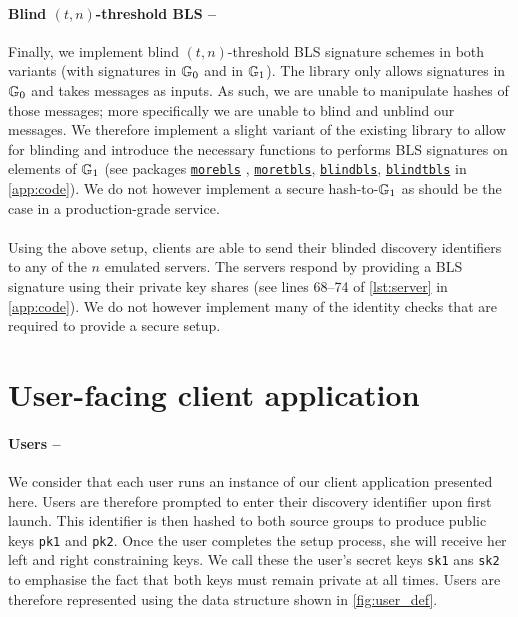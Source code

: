   	\paragraph{Blind $(t,n)$-threshold BLS --} Finally, we implement blind $(t,n)$-threshold BLS signature schemes in both variants (with signatures in $\mathbb{G}_0$ and in $\mathbb{G}_1$). The \kyber\;library only allows signatures in $\mathbb{G}_0$ and takes messages as inputs. As such, we are unable to manipulate hashes of those messages; more specifically we are unable to blind and unblind our messages. We therefore implement a slight variant of the existing library to allow for blinding and introduce the necessary functions to performs BLS signatures on elements of $\mathbb{G}_1$  (see packages \hyperref[app:morebls]{\texttt{morebls}} , \hyperref[app:moretbls]{\texttt{moretbls}}, \hyperref[app:blindbls]{\texttt{blindbls}}, \hyperref[app:blindtbls]{\texttt{blindtbls}} in \autoref{app:code}). We do not however implement a secure hash-to-$\mathbb{G}_1$ as should be the case in a production-grade service.
  	
  	\paragraph{} Using the above setup, clients are able to send their blinded discovery identifiers to any of the $n$ emulated servers. The servers respond by providing a BLS signature using their private key shares (see lines 68--74 of \autoref{lst:server} in \autoref{app:code}). We do not however implement many of the identity checks that are required to provide a secure setup.
  	
  	
  	  	
\section{User-facing client application}

	\paragraph{Users --} We consider that each user runs an instance of our client application presented here. Users are therefore prompted to enter their discovery identifier upon first launch. This identifier is then hashed to both source groups to produce public keys \texttt{pk1} and \texttt{pk2}. Once the user completes the setup process, she will receive her left and right constraining keys. We call these the user's secret keys \texttt{sk1} ans \texttt{sk2} to emphasise the fact that both keys must remain private at all times. Users are therefore represented using the data structure shown in \autoref{fig:user_def}.
	

